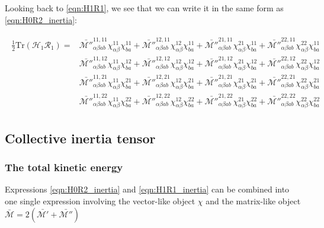 Looking back to \ref{eqn:H1R1}, we see that we can write it in the same form as \ref{eqn:H0R2_inertia}:

\begin{tcolorbox}
	\begin{align}\label{eqn:H1R1_inertia}
	\begin{aligned}
	\frac{1}{2}\mathrm{Tr}\left(\mathcal{H}_1\mathcal{R}_1\right) = &
	\mathcal{\bar{M''}}^{11,11}_{\alpha\beta ab}\chi^{11}_{\alpha\beta}\chi^{11}_{ba} +
	\mathcal{\bar{M''}}^{12,11}_{\alpha\beta ab}\chi^{12}_{\alpha\beta}\chi^{11}_{ba} +
	\mathcal{\bar{M''}}^{21,11}_{\alpha\beta ab}\chi^{21}_{\alpha\beta}\chi^{11}_{ba} +
	\mathcal{\bar{M''}}^{22,11}_{\alpha\beta ab}\chi^{22}_{\alpha\beta}\chi^{11}_{ba} \\
	&
	\mathcal{\bar{M''}}^{11,12}_{\alpha\beta ab}\chi^{11}_{\alpha\beta}\chi^{12}_{ba} +
	\mathcal{\bar{M''}}^{12,12}_{\alpha\beta ab}\chi^{12}_{\alpha\beta}\chi^{12}_{ba} +
	\mathcal{\bar{M''}}^{21,12}_{\alpha\beta ab}\chi^{21}_{\alpha\beta}\chi^{12}_{ba} +
	\mathcal{\bar{M''}}^{22,12}_{\alpha\beta ab}\chi^{22}_{\alpha\beta}\chi^{12}_{ba} \\
	&
	\mathcal{\bar{M''}}^{11,21}_{\alpha\beta ab}\chi^{11}_{\alpha\beta}\chi^{21}_{ba} +
	\mathcal{\bar{M''}}^{12,21}_{\alpha\beta ab}\chi^{12}_{\alpha\beta}\chi^{21}_{ba} +
	\mathcal{\bar{M''}}^{21,21}_{\alpha\beta ab}\chi^{21}_{\alpha\beta}\chi^{21}_{ba} +
	\mathcal{\bar{M''}}^{22,21}_{\alpha\beta ab}\chi^{22}_{\alpha\beta}\chi^{21}_{ba} \\
	&
	\mathcal{\bar{M''}}^{11,22}_{\alpha\beta ab}\chi^{11}_{\alpha\beta}\chi^{22}_{ba} +
	\mathcal{\bar{M''}}^{12,22}_{\alpha\beta ab}\chi^{12}_{\alpha\beta}\chi^{22}_{ba} +
	\mathcal{\bar{M''}}^{21,22}_{\alpha\beta ab}\chi^{21}_{\alpha\beta}\chi^{22}_{ba} +
	\mathcal{\bar{M''}}^{22,22}_{\alpha\beta ab}\chi^{22}_{\alpha\beta}\chi^{22}_{ba}
	\end{aligned}
	\end{align}
\end{tcolorbox}


\subsection{Collective inertia tensor}

\subsubsection{The total kinetic energy}

Expressions \ref{eqn:H0R2_inertia} and \ref{eqn:H1R1_inertia} can be combined into one single expression involving the vector-like object $\chi$ and the matrix-like object $\mathcal{\bar{M}}=2(\mathcal{\bar{M'}+\bar{M''}})$


